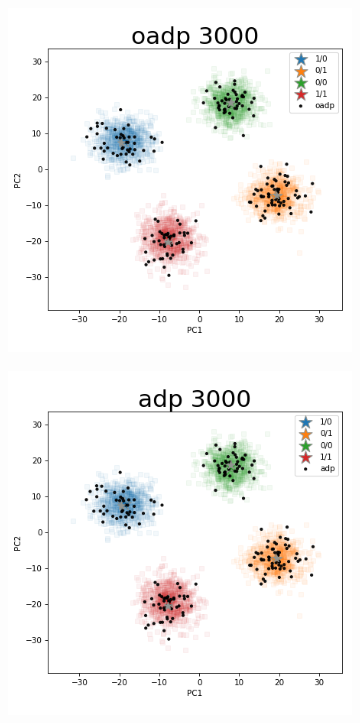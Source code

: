 \documentclass{article}
\begin{document}
\begin{figure}
\begin{subfigure}{.5\textwidth}
\end{subfigure}
\hfill
\begin{subfigure}{.5\textwidth}
  \centering
  \includegraphics[width=.98\linewidth]{img/ggsim3000_100000_200_2_1_100_1_sturef_ggsim3000_100000_3000_2_1_100_0_oadp}
\end{subfigure}%
\begin{subfigure}{.5\textwidth}
  \centering
  \includegraphics[width=.98\linewidth]{img/ggsim3000_100000_200_2_1_100_1_sturef_ggsim3000_100000_3000_2_1_100_0_adp}

\end{subfigure}
\end{figure}
\end{document}
